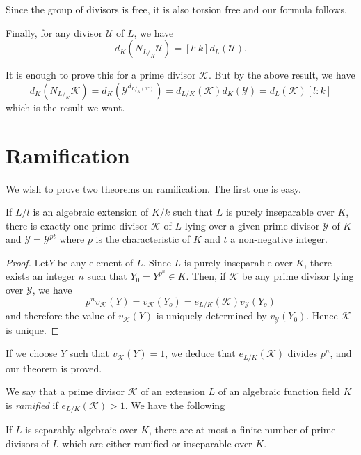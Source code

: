 Since the group of divisors is free, it is  also torsion  free and our
formula follows. 

Finally, for any divisor $\mathscr{U}$ of $L$, we have 
$$
d_K (N_{L /_K} \mathscr{U}) = [l : k] d_L(\mathscr{U}).
$$

It is enough to prove this for a prime divisor $\mathscr{K}$. But by
the above result, we have 
$$
d_K (N_{L /_K}\mathscr{K})= d_K (\mathscr{Y}^{d_{L / _K
    (\mathscr{K})}})= d_{L /K}(\mathscr{K}) d_K(\mathscr{Y}) = d_L
(\mathscr{K}) [l : k] 
$$
which is the result we want.

\section{Ramification}\label{chap20:sec35} %

We wish to prove two theorems on ramification. The first one is easy.

\begin{theorem*}%
  If $L /l$ is an algebraic extension of $K /k$ such that $L$ is
  purely inseparable over $K$, there is exactly one prime divisor
  $\mathscr{K}$ of $L$ lying over a given prime divisor $\mathscr{Y}$
  of $K$ and $\mathscr{Y}=\mathscr{Y}^{pt}$ where $p$ is the
  characteristic of $K$ and $t$ a non-negative integer. 
\end{theorem*}

\begin{proof}
  Let\pageoriginale $Y$ be any element of $L$. Since $L$ is purely inseparable over
  $K$, there exists an integer $n$ such that $Y_0= Y^{p^n} \in
  K$. Then, if $\mathscr{K}$ be any prime divisor lying over
  $\mathscr{Y}$, we have 
  $$
  p^n v_{\mathscr{K}}(Y) = v_{\mathscr{K}}(Y_o) = e_{L
    /K}(\mathscr{K}) v_{\mathscr{Y}}(Y_o) 
  $$
  and therefore the value of $v_{\mathscr{K}}(Y)$ is uniquely
  determined by $v_\mathscr{Y}(Y_0)$.  
  Hence $\mathscr{K}$ is unique.
\end{proof}

If we choose $Y$ such that $v_\mathscr{K}(Y)=1$, we deduce that $e_{L
  /K}(\mathscr{K})$ divides $p^n$, and our theorem is proved. 

We say that a prime divisor $\mathscr{K}$ of an extension $L$ of an
algebraic function field $K$ is \textit{ramified} if $e_{L /
  K}(\mathscr{K}) > 1$. We have the following 

\begin{theorem*}%
  If $L$ is separably algebraic over $K$, there are at most a finite
  number of prime divisors of $L$ which are either ramified or
  inseparable over $K$. 
\end{theorem*}

